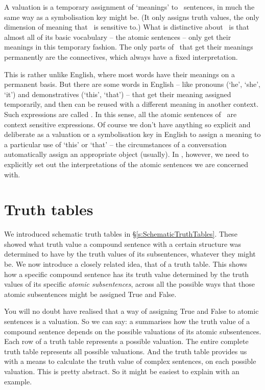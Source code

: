 A valuation is a temporary assignment of `meanings' to \TFL\ sentences, in much the same way as a symbolisation key might be. (It only assigns truth values, the only dimension of meaning that \TFL\ is sensitive to.) What is distinctive about \TFL\ is that almost all of its basic vocabulary – the atomic sentences – only get their meanings in this temporary fashion. The only parts of \TFL\ that get their meanings permanently are the connectives, which always have a fixed interpretation. 

This is rather unlike English, where most words have their meanings on a permanent basis. But there are some words in English – like pronouns (`he', `she', `it') and demonstratives (`this', `that') – that get their meaning assigned temporarily, and then can be reused with a different meaning in another context. Such expressions are called . In this sense, all the atomic sentences of \TFL\ are context sensitive expressions. Of course we don't have anything so explicit and deliberate as a valuation or a symbolisation key in English to assign a meaning to a particular use of `this' or `that' – the circumstances of a conversation automatically assign an appropriate object (usually). In \TFL, however, we need to explicitly set out the interpretations of the atomic sentences we are concerned with. 

\section{Truth tables}

We introduced schematic truth tables in §\ref{s:SchematicTruthTables}. These showed what truth value a compound sentence with a certain structure was determined to have by the truth values of its subsentences, whatever they might be. We now introduce a closely related idea, that of a truth table. This shows how a specific compound sentence has its truth value determined by the truth values of its specific \emph{atomic subsentences}, across all the possible ways that those atomic subsentences might be assigned True and False.

You will no doubt have realised that a way of assigning True and False to atomic sentences is a valuation. So we can say: a  summarises how the truth value of a compound sentence depends on the possible valuations of its atomic subsentences. Each row of a truth table represents a possible valuation. The entire complete truth table represents all possible valuations. And the truth table provides us with a means to calculate the truth value of complex sentences, on each possible valuation. This is pretty abstract. So it might be easiest to explain with an example.

